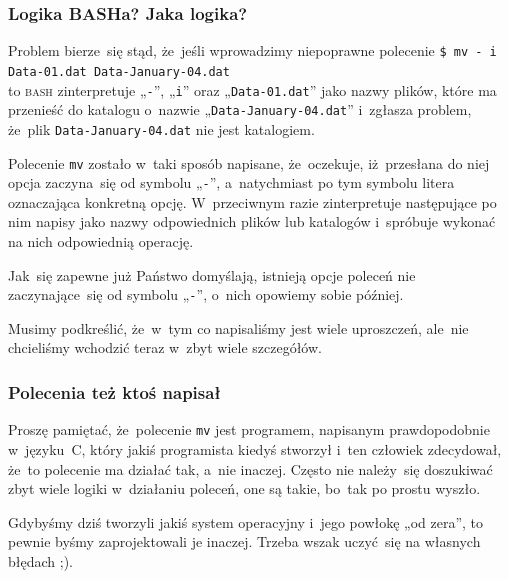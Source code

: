 \documentclass[10pt,t]{beamer}
\begin{document}
\begin{frame}
  \frametitle{Logika BASHa? Jaka logika?}


  Problem bierze~się stąd, że~jeśli wprowadzimy niepoprawne polecenie
  \texttt{\$ mv - i Data-01.dat Data-January-04.dat} \\
  to \textsc{bash} zinterpretuje „\texttt{-}”, „\texttt{i}” oraz
  „\texttt{Data-01.dat}” jako nazwy \alert{plików}, które ma przenieść
  do katalogu o~nazwie „\texttt{Data-January-04.dat}” i~zgłasza problem,
  że~plik \texttt{Data-January-04.dat} nie jest katalogiem.

  Polecenie \texttt{mv} zostało w~taki sposób napisane, że~oczekuje,
  iż~przesłana do niej opcja zaczyna~się od symbolu „\texttt{-}”,
  a~natychmiast po tym symbolu litera oznaczająca konkretną opcję.
  W~przeciwnym razie zinterpretuje następujące po nim napisy jako nazwy
  odpowiednich plików lub katalogów i~spróbuje wykonać na nich odpowiednią
  operację.

  Jak~się zapewne już Państwo domyślają, istnieją opcje poleceń nie
  zaczynające~się od symbolu „\texttt{-}”, o~nich opowiemy sobie później.

  Musimy podkreślić, że~w~tym co napisaliśmy jest wiele uproszczeń,
  ale~nie chcieliśmy wchodzić teraz w~zbyt wiele szczegółów.

\end{frame}





\begin{frame}
  \frametitle{Polecenia też ktoś napisał}


  Proszę pamiętać, że~polecenie \texttt{mv} jest programem, napisanym
  prawdopodobnie w~języku~C, który jakiś programista kiedyś stworzył i~ten
  człowiek zdecydował, że~to polecenie ma działać tak, a~nie inaczej.
  Często nie należy~się doszukiwać zbyt wiele logiki w~działaniu poleceń,
  one są takie, bo~tak po prostu wyszło.

  Gdybyśmy dziś tworzyli jakiś system operacyjny i~jego powłokę „od zera”,
  to pewnie byśmy zaprojektowali je inaczej. Trzeba wszak uczyć~się na
  własnych błędach ;).

\end{frame}
\end{document}
